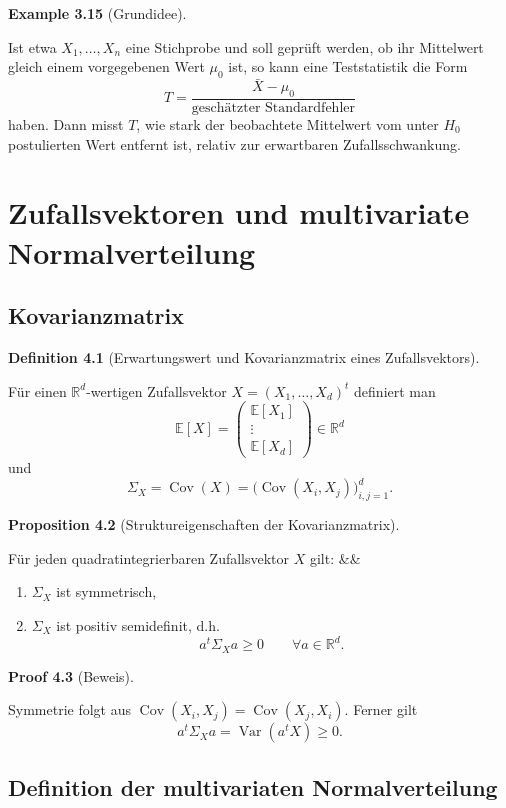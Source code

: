 \documentclass[10pt, letterpaper]{article}
\newcommand{\R}{\mathbb{R}}
\newenvironment{romanenum}[1][]
  {%
    \ifx&#1&
    \else
      \textbf{#1}\quad
    \fi
    \begin{enumerate}[label=\roman*)]
  }
  {%
    \end{enumerate}%
  }
\newcommand{\CustomHeading}[3]{%
  \par\medskip\noindent%
  \textbf{#1 #2} \textnormal{(#3)}.\enskip%
}
\newenvironment{DEF}[2]{\CustomHeading{Definition}{#1}{#2}}{}
\newenvironment{PROP}[2]{\CustomHeading{Proposition}{#1}{#2}}{}
\newenvironment{EXA}[2]{\CustomHeading{Example}{#1}{#2}}{}
\newenvironment{PROOF}[2]{\CustomHeading{Proof}{#1}{#2}}{}
\begin{document}
\begin{EXA}{3.15}{Grundidee}
Ist etwa \(X_1,\dots,X_n\) eine Stichprobe und soll geprüft werden, ob ihr Mittelwert gleich einem vorgegebenen Wert \(\mu_0\) ist, so kann eine Teststatistik die Form
\[
T=\frac{\bar X-\mu_0}{\text{geschätzter Standardfehler}}
\]
haben. Dann misst \(T\), wie stark der beobachtete Mittelwert vom unter \(H_0\) postulierten Wert entfernt ist, relativ zur erwartbaren Zufallsschwankung.
\end{EXA}


\section{Zufallsvektoren und multivariate Normalverteilung}

\subsection{Kovarianzmatrix}

\begin{DEF}{4.1}{Erwartungswert und Kovarianzmatrix eines Zufallsvektors}
Für einen \(\R^d\)-wertigen Zufallsvektor \(X=(X_1,\dots,X_d)^t\) definiert man
\[
\mathbb E[X]
=
\begin{pmatrix}
\mathbb E[X_1]\\
\vdots\\
\mathbb E[X_d]
\end{pmatrix}
\in\R^d
\]
und
\[
\Sigma_X
=
\operatorname{Cov}(X)
=
\bigl(\operatorname{Cov}(X_i,X_j)\bigr)_{i,j=1}^d.
\]
\end{DEF}

\begin{PROP}{4.2}{Struktureigenschaften der Kovarianzmatrix}
Für jeden quadratintegrierbaren Zufallsvektor \(X\) gilt:
\begin{romanenum}
    \item \(\Sigma_X\) ist symmetrisch,
    \item \(\Sigma_X\) ist positiv semidefinit, d.h.
    \[
    a^t\Sigma_X a\ge 0\qquad\forall a\in\R^d.
    \]
\end{romanenum}
\end{PROP}

\begin{PROOF}{4.3}{Beweis}
Symmetrie folgt aus \(\operatorname{Cov}(X_i,X_j)=\operatorname{Cov}(X_j,X_i)\). Ferner gilt
\[
a^t\Sigma_X a
=
\operatorname{Var}(a^tX)\ge 0.
\]
\end{PROOF}

\subsection{Definition der multivariaten Normalverteilung}
\end{document}
